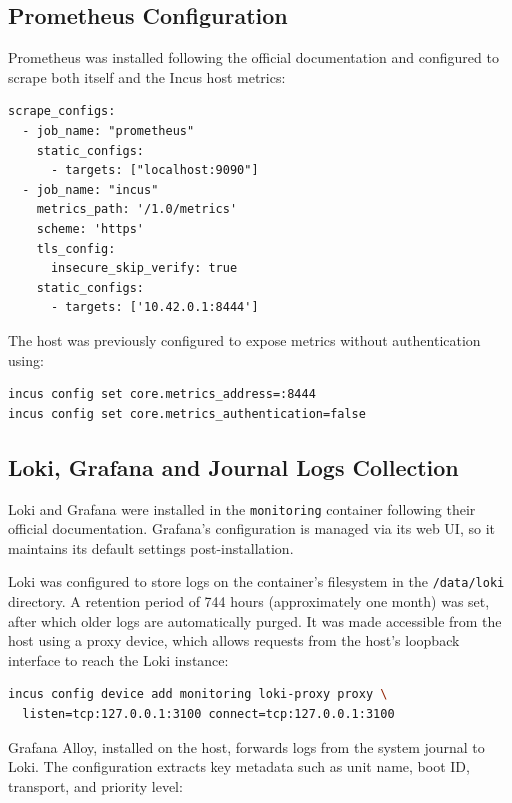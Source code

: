 \subsection*{Prometheus Configuration}

Prometheus was installed following the official documentation\cite{prometheus-getting-started} and configured to scrape both itself and the Incus host metrics:

\begin{lstlisting}[caption={Prometheus configuration to scrape metrics from itself and the Incus host.}]
scrape_configs:
  - job_name: "prometheus"
    static_configs:
      - targets: ["localhost:9090"]
  - job_name: "incus"
    metrics_path: '/1.0/metrics'
    scheme: 'https'
    tls_config:
      insecure_skip_verify: true
    static_configs:
      - targets: ['10.42.0.1:8444']
\end{lstlisting}

The host was previously configured to expose metrics without authentication using:

\begin{lstlisting}[language=bash]
incus config set core.metrics_address=:8444
incus config set core.metrics_authentication=false
\end{lstlisting}

\subsection*{Loki, Grafana and Journal Logs Collection}

Loki and Grafana were installed in the \texttt{monitoring} container following their official documentation\cite{grafana-install-debian}. Grafana's configuration is managed via its web UI, so it maintains its default settings post-installation.

Loki was configured to store logs on the container's filesystem in the \texttt{/data/loki} directory. A retention period of 744 hours (approximately one month) was set, after which older logs are automatically purged. It was made accessible from the host using a proxy device, which allows requests from the host's loopback interface to reach the Loki instance:

\begin{lstlisting}[language=bash]
incus config device add monitoring loki-proxy proxy \
  listen=tcp:127.0.0.1:3100 connect=tcp:127.0.0.1:3100
\end{lstlisting}

Grafana Alloy, installed on the host\cite{grafana-alloy-install}, forwards logs from the system journal to Loki. The configuration\cite{grafana-alloy-config-example} extracts key metadata such as unit name, boot ID, transport, and priority level:

